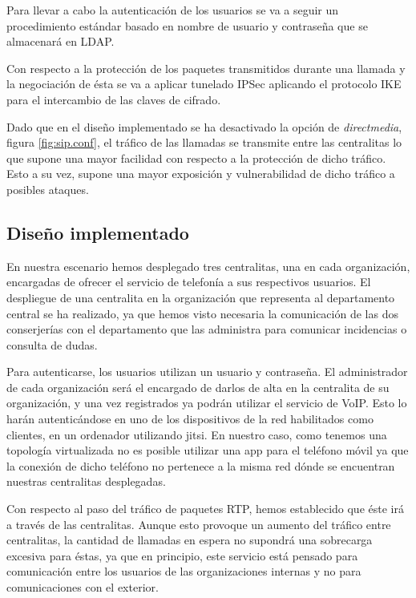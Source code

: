 \documentclass[a4paper]{article}
\begin{document}
 
Para llevar a cabo la autenticación de los usuarios se va a seguir un procedimiento estándar basado en nombre de usuario y contraseña que se almacenará en LDAP. 

 
Con respecto a la protección de los paquetes transmitidos durante una llamada y la
negociación de ésta se va a aplicar tunelado IPSec aplicando el protocolo IKE para el intercambio de las claves de cifrado.

  
Dado que en el diseño implementado se ha desactivado la opción de \textit{directmedia}, figura \ref{fig:sip.conf}, el tráfico de las llamadas se transmite entre las centralitas lo que supone una mayor facilidad con respecto a la protección de dicho tráfico. Esto a su vez, supone una mayor exposición y vulnerabilidad de dicho tráfico a posibles ataques.

\subsection{Diseño implementado}

En nuestra escenario hemos desplegado tres centralitas, una en cada organización, encargadas de ofrecer el servicio de telefonía a sus respectivos usuarios. El despliegue de una centralita en la organización que representa al departamento central se ha realizado, ya que hemos visto necesaria la comunicación de las dos conserjerías con el departamento que las administra para comunicar incidencias o consulta de dudas.

 
Para autenticarse, los usuarios utilizan un usuario y contraseña. El administrador de cada organización será el encargado de darlos de alta en la centralita de su organización, y una vez registrados ya podrán utilizar el servicio de VoIP. Esto lo harán autenticándose en uno de los dispositivos de la red habilitados como clientes, en un ordenador utilizando jitsi. En nuestro caso, como tenemos una topología virtualizada no es posible utilizar una app para el teléfono móvil ya que la conexión de dicho teléfono no pertenece a la misma red dónde se encuentran nuestras centralitas desplegadas.

 
Con respecto al paso del tráfico de paquetes RTP, hemos establecido que éste irá a través de las centralitas. Aunque esto provoque un aumento del tráfico entre centralitas, la cantidad de llamadas en espera no supondrá una sobrecarga excesiva para éstas, ya que en principio, este servicio está pensado para comunicación entre los usuarios de las organizaciones internas y no para comunicaciones con el exterior.
\end{document}

